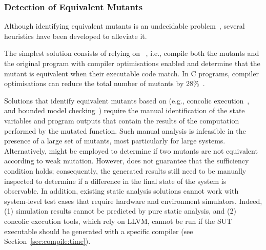 \subsubsection{Detection of Equivalent Mutants}
\label{sec:background:equivalent}

Although identifying equivalent mutants is an undecidable problem~\cite{madeyski2013overcoming,Bugg:Correctness:82}, several heuristics have been developed to alleviate it. 

The simplest solution consists of relying on ~\cite{papadakis2015trivial, kintis2017detecting,papadakis2019mutation}, i.e., compile both the mutants and the original program with compiler optimisations enabled and determine that the mutant is equivalent when their executable code match. In C programs, compiler optimisations can reduce the total number of mutants by 28\%~\cite{kintis2017detecting}.



Solutions that identify equivalent mutants based on  (e.g., concolic execution~\cite{holling2016nequivack}, and bounded model checking~\cite{riener2011test}) require the manual identification of the state variables and program outputs that contain the results of the computation performed by the mutated function.
Such manual analysis is infeasible in the presence of a large set of mutants, most particularly for large systems. 
Alternatively,  might be employed to determine if two mutants are not equivalent according to weak mutation. 
However,  does not guarantee that the sufficiency condition holds; consequently, the generated results still need to be manually inspected to determine if a difference in the final state of the system is observable. In addition, existing static analysis solutions cannot work with system-level test cases that require hardware and environment simulators.
Indeed, (1) simulation results cannot be predicted by pure static analysis, and (2) concolic execution tools, which rely on LLVM, cannot be run if the SUT executable should be generated with a specific compiler (see Section~\ref{sec:compile:time}).

